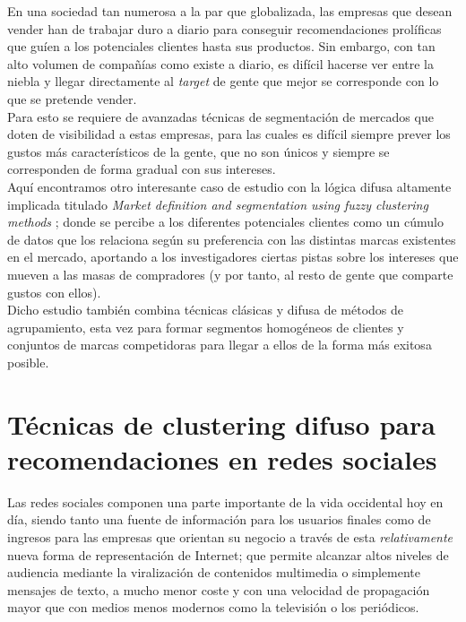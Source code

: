 \documentclass[]{report}
\begin{document}
			En una sociedad tan numerosa a la par que globalizada, las empresas que desean vender han de trabajar duro a diario para conseguir recomendaciones prolíficas que guíen a los potenciales clientes hasta sus productos. Sin embargo, con tan alto volumen de compañías como existe a diario, es difícil hacerse ver entre la niebla y llegar directamente al \textit{target} de gente que mejor se corresponde con lo que se pretende vender.\\
			
			Para esto se requiere de avanzadas técnicas de segmentación de mercados que doten de visibilidad a estas empresas, para las cuales es difícil siempre prever los gustos más característicos de la gente, que no son únicos y siempre se corresponden de forma gradual con sus intereses.\\
			
			Aquí encontramos otro interesante caso de estudio con la lógica difusa altamente implicada titulado \textit{Market definition and segmentation using fuzzy clustering methods} \cite{marketing}; donde se percibe a los diferentes potenciales clientes como un cúmulo de datos que los relaciona según su preferencia con las distintas marcas existentes en el mercado, aportando a los investigadores ciertas pistas sobre los intereses que mueven a las masas de compradores (y por tanto, al resto de gente que comparte gustos con ellos).\\
			
			Dicho estudio también combina técnicas clásicas y difusa de métodos de agrupamiento, esta vez para formar segmentos homogéneos de clientes y conjuntos de marcas competidoras para llegar a ellos de la forma más exitosa posible.
			
		\section{Técnicas de clustering difuso para recomendaciones en redes sociales}
		
			Las redes sociales componen una parte importante de la vida occidental hoy en día, siendo tanto una fuente de información para los usuarios finales como de ingresos para las empresas que orientan su negocio a través de esta \textit{relativamente} nueva forma de representación de Internet; que permite alcanzar altos niveles de audiencia mediante la viralización de contenidos multimedia o simplemente mensajes de texto, a mucho menor coste y con una velocidad de propagación mayor que con medios menos modernos como la televisión o los periódicos.\\
			
\end{document}
